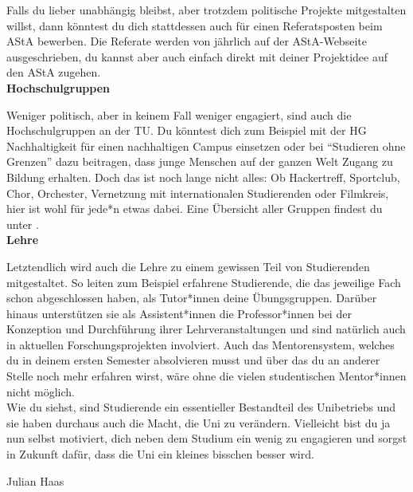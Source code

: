 {    Falls du lieber unabhängig bleibst, aber trotzdem politische Projekte mitgestalten willst, dann könntest du dich stattdessen auch für einen Referatsposten beim AStA bewerben. Die Referate werden von jährlich auf der AStA-Webseite \footnotemark[2] ausgeschrieben, du kannst aber auch einfach direkt mit deiner Projektidee auf den AStA zugehen.\\

    \textbf{Hochschulgruppen}

    Weniger politisch, aber in keinem Fall weniger engagiert, sind auch die Hochschulgruppen an der TU. Du könntest dich zum Beispiel mit der HG Nachhaltigkeit für einen nachhaltigen Campus einsetzen oder bei "`Studieren ohne Grenzen"' dazu beitragen, dass junge Menschen auf der ganzen Welt Zugang zu Bildung erhalten.
    Doch das ist noch lange nicht alles: Ob Hackertreff, Sportclub, Chor, Orchester, Vernetzung mit internationalen Studierenden oder Filmkreis, hier ist wohl für jede*n etwas dabei.
    Eine Übersicht aller Gruppen findest du unter \footnotemark[3].\\

    \textbf{Lehre}

    Letztendlich wird auch die Lehre zu einem gewissen Teil von Studierenden mitgestaltet. So leiten zum Beispiel erfahrene Studierende, die das jeweilige Fach schon abgeschlossen haben, als Tutor*innen deine Übungsgruppen. Darüber hinaus unterstützen sie als Assistent*innen die Professor*innen bei der Konzeption und Durchführung ihrer Lehrveranstaltungen und sind natürlich auch in aktuellen Forschungsprojekten involviert.
    Auch das Mentorensystem, welches du in deinem ersten Semester absolvieren musst und über das du an anderer Stelle noch mehr erfahren wirst, wäre ohne die vielen studentischen Mentor*innen nicht möglich.\\

    Wie du siehst, sind Studierende ein essentieller Bestandteil des Unibetriebs und sie haben durchaus auch die Macht, die Uni zu verändern. Vielleicht bist du ja nun selbst motiviert, dich neben dem Studium ein wenig zu engagieren und sorgst in Zukunft dafür, dass die Uni ein kleines bisschen besser wird.}
{Julian Haas}

